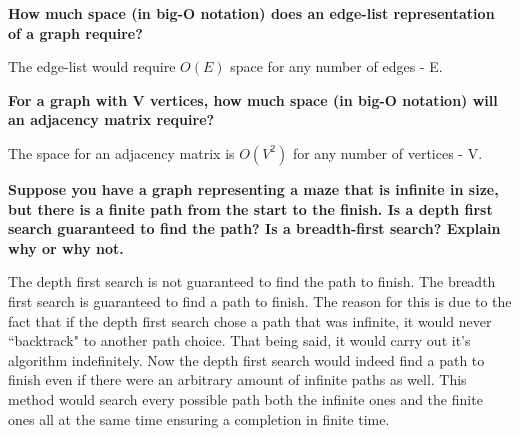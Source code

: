 \documentclass[12pt, letterpaper]{article}
\begin{document}
\noindent\textbf{How much space (in big-O notation) does an edge-list representation of a graph require?}

The edge-list would require $O(E)$ space for any number of edges - E.
\vspace{0.2in}

\noindent\textbf{For a graph with V vertices, how much space (in big-O notation) will an adjacency matrix require?}

The space for an adjacency matrix is $O(V^2)$ for any number of vertices - V.
\vspace{0.2in}

\noindent\textbf{Suppose you have a graph representing a maze that is infinite in size, but there is a finite path from the start to the finish. Is a depth first search guaranteed to find the path? Is a breadth-first search? Explain why or why not.}

The depth first search is not guaranteed to find the path to finish. The breadth first search is guaranteed to find a path to finish. The reason for this is due to the fact that if the depth first search chose a path that was infinite, it would never ``backtrack" to another path choice. That being said, it would carry out it's algorithm indefinitely. Now the depth first search would indeed find a path to finish even if there were an arbitrary amount of infinite paths as well. This method would search every possible path both the infinite ones and the finite ones all at the same time ensuring a completion in finite time.
\end{document}

